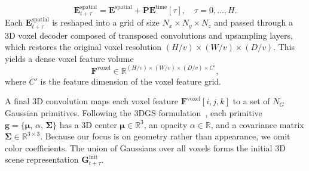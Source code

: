 \begin{equation}
\mathbf{E}^{\text{spatial}}_{t+\tau} = \mathbf{E}^{\text{spatial}} + \mathbf{PE}^{\text{time}}[\tau], \quad \tau=0,\ldots,H.
\end{equation}
Each $\mathbf{E}^{\text{spatial}}_{t+\tau}$ is reshaped into a grid of size $N_x \times N_y \times N_z$ and passed through a 3D voxel decoder composed of transposed convolutions and upsampling layers, which restores the original voxel resolution $(H/v) \times (W/v) \times (D/v)$. This yields a dense voxel feature volume
\begin{equation}
\mathbf{F}^{\text{voxel}} \in \mathbb{R}^{(H/v) \times (W/v) \times (D/v) \times C'},
\end{equation}
where $C'$ is the feature dimension of the voxel feature grid. 


A final 3D convolution maps each voxel feature $\mathbf{F}^{\text{voxel}}[i,j,k]$ to a set of $N_G$ Gaussian primitives. Following the 3DGS formulation~\cite{kerbl20233d}, each primitive
$
\mathbf{g}=\{\bm{\mu},\,\alpha,\,\bm{\Sigma}\}
$
has a 3D center $\bm{\mu}\in\mathbb{R}^3$, an opacity $\alpha\in\mathbb{R}$, and a covariance matrix $\bm{\Sigma}\in\mathbb{R}^{3\times 3}$. Because our focus is on geometry rather than appearance, we omit color coefficients. The union of Gaussians over all voxels forms the initial 3D scene representation $\mathbf{G}^{\text{init}}_{t+\tau}$.

